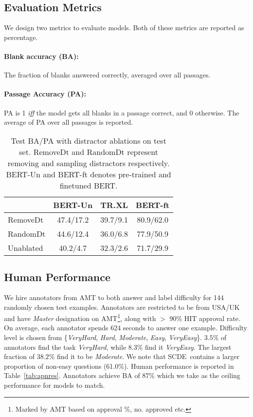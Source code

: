 \documentclass[11pt,a4paper]{article}
\newcommand{\dsname}{\textsc{SCDE}}
\begin{document}
\subsection{Evaluation Metrics}
We design two metrics to evaluate models. Both of these metrics are reported as percentage.
\paragraph{Blank accuracy (BA):} The fraction of blanks answered correctly, averaged over all passages.
\paragraph{Passage Accuracy (PA):} PA is 1 \emph{iff} the model gets all blanks in a passage correct, and 0 otherwise. The average of PA over all passages is reported.


\begin{table}
    \centering
    \begin{tabular}{l|c|c|c}
    \toprule
         & BERT-Un & TR.XL & BERT-ft\\
         \midrule
        RemoveDt & 47.4/17.2 & 39.7/9.1  & 80.9/62.0\\
        RandomDt & 44.6/12.4 & 36.0/6.8  & 77.9/50.9\\
        Unablated & 40.2/4.7 & 32.3/2.6 & 71.7/29.9\\
        \bottomrule
    \end{tabular}
    \caption{Test BA/PA with distractor ablations on test set. RemoveDt and RandomDt represent removing and sampling distractors respectively. BERT-Un and BERT-ft denotes pre-trained and finetuned BERT.}
    \label{tab:ablationres}
\end{table}

\subsection{Human Performance}
We hire annotators from AMT to both answer and label difficulty for 144 randomly chosen test examples. Annotators are restricted to be from USA/UK and have \emph{Master} designation on AMT\footnote{Marked by AMT based on approval \%, no. approved etc.}, along with $>$ $90$\% HIT approval rate. 
On average, each annotator spends 624 seconds to answer one example. Difficulty level is chosen from \{\textit{VeryHard}, \textit{Hard}, \textit{Moderate}, \textit{Easy}, \textit{VeryEasy}\}. $3.5$\% of annotators find the task \textit{VeryHard}, while $8.3\%$ find it \textit{VeryEasy}. The largest fraction of $38.2\%$ find it to be \textit{Moderate}. We note that \dsname~contains a larger proportion of non-easy questions (61.0\%). Human performance is reported in Table~\ref{tab:apnres}. Annotators achieve BA of 87\%
which we take as the ceiling performance for models to match. 
\end{document}
